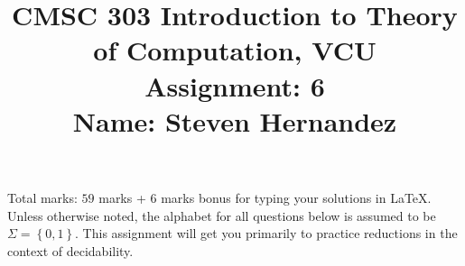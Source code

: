 \documentclass{article}
\newcommand{\set}[1]{{\left\{#1\right\}}}    %
\begin{document}
\title{
    CMSC 303 Introduction to Theory of Computation, VCU\\
    Assignment: 6\\
    Name: Steven Hernandez
}

\date{}
\maketitle

\vspace{-5mm}
\noindent Total marks: $59$ marks + $6$ marks bonus for typing your solutions in LaTeX.\vspace{2mm}\\

\noindent Unless otherwise noted, the alphabet for all questions below is assumed to be $\Sigma=\set{0,1}$. This assignment will get you primarily to practice reductions in the context of decidability.
\end{document}
